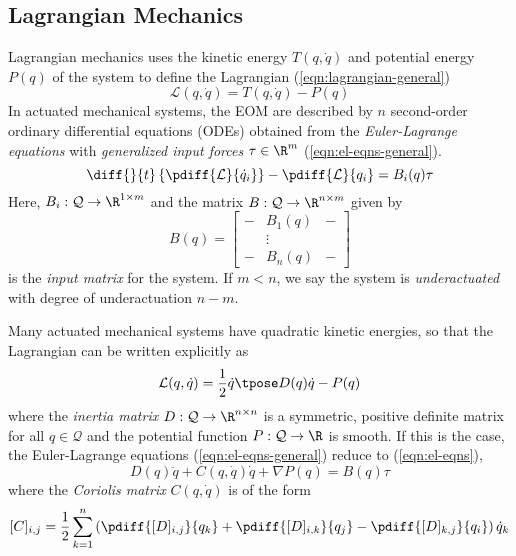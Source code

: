 \subsection{Lagrangian Mechanics}

Lagrangian mechanics uses the kinetic energy \(T(q,\dot{q})\) and potential
energy \(P(q)\) of the system to define the Lagrangian
(\ref{eqn:lagrangian-general})
\begin{equation}\label{eqn:lagrangian-general}
    \mathcal{L}(q,\dot{q}) = T(q,\dot{q}) - P(q)
\end{equation}
In actuated mechanical systems, the EOM are described by \(n\) second-order
ordinary differential equations (ODEs) obtained from the \textit{Euler-Lagrange
equations} with \textit{generalized input forces} \(\tau \in \R^m\) 
(\ref{eqn:el-eqns-general}). 
\begin{equation}\label{eqn:el-eqns-general}
    \diff{}{t}\left\{ \pdiff{\mathcal{L}}{\dot{q}_i} \right\}
    - \pdiff{\mathcal{L}}{q_i} = B_i(q) \tau
\end{equation}
Here, \(B_i: \mathcal{Q} \rightarrow \R^{1\times m}\)
and the matrix  \(B: \mathcal{Q} \rightarrow \R^{n \times m}\) given by
\[
    B(q) =\begin{bmatrix}
        - & B_1(q) & - \\
          & \vdots & \\
        - & B_n(q) & -
    \end{bmatrix}
\]
is the \textit{input matrix} for the system. If \(m < n\), we say the system is
\textit{underactuated} with degree of underactuation \(n - m\).

Many actuated mechanical systems have quadratic kinetic energies, so that the
Lagrangian can be written explicitly as
\begin{equation}\label{eqn:lagrangian}
    \mathcal{L}(q,\dot{q}) = \frac{1}{2} \dot{q}\tpose D(q) \dot{q} - P(q)
\end{equation}
where the \textit{inertia matrix} \(D: \mathcal{Q} \rightarrow \R^{n\times n}\) 
is a symmetric, positive definite matrix for all \(q \in \mathcal{Q}\) and the
potential function \(P : \mathcal{Q} \rightarrow \R\) is smooth. 
If this is the case, the Euler-Lagrange equations
(\ref{eqn:el-eqns-general}) reduce to (\ref{eqn:el-eqns}),
\begin{equation}\label{eqn:el-eqns}
    D(q)\ddot{q} + C(q,\dot{q})\dot{q} + \nabla P(q) = B(q)\tau
\end{equation}
where the \textit{Coriolis matrix} \(C(q,\dot{q})\) is of the form
\[
    [C]_{i,j} = \frac{1}{2}\sum\limits_{k = 1}^n 
    \left(\pdiff{[D]_{i,j}}{q_k}  +
     \pdiff{[D]_{i,k}}{q_j} -
     \pdiff{[D]_{k,j}}{q_i}\right)\dot{q}_k
\]

